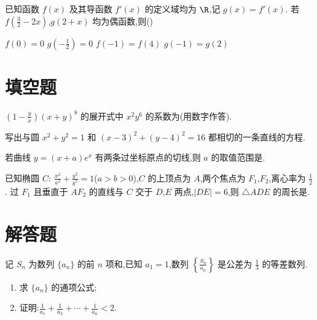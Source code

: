 \begin{problem}
已知函数 \(f(x)\) 及其导函数 \(f'(x)\) 的定义域均为 \(\R\),记 \(g(x)=f'(x)\). 若 \(f\left(\frac32-2x\right)\),\(g(2+x)\) 均为偶函数,则(\quad)

\choices
    {\(f(0)=0\)}
    {\(g\left(-\frac12\right)=0\)}
    {\(f(-1)=f(4)\)}
    {\(g(-1)=g(2)\)}
\end{problem}

\section{填空题}

\begin{problem}
\( \left(1-\frac{y}{x}\right)(x+y)^8 \) 的展开式中 \(x^2y^6\) 的系数为\fillinblank{}(用数字作答).
\end{problem}

\begin{problem}
写出与圆 \(x^2+y^2=1\) 和 \((x-3)^2+(y-4)^2=16\) 都相切的一条直线的方程\fillinblank{}.
\end{problem}

\begin{problem}
若曲线 \(y=(x+a)e^x\) 有两条过坐标原点的切线,则 \(a\) 的取值范围是\fillinblank{}.
\end{problem}

\begin{problem}
已知椭圆 \(C:\ \frac{x^2}{a^2}+\frac{y^2}{b^2}=1\)(\(a>b>0\)),\(C\) 的上顶点为 \(A\),两个焦点为 \(F_1\),\(F_2\),离心率为 \(\frac12\). 过 \(F_1\) 且垂直于 \(AF_2\) 的直线与 \(C\) 交于 \(D\),\(E\) 两点,\(|DE|=6\),则 \(\triangle ADE\) 的周长是\fillinblank{}.
\end{problem}

\section{解答题}

\begin{problem}
记 \(S_n\) 为数列 \(\{a_n\}\) 的前 \(n\) 项和,已知 \(a_1=1\),数列 \(\left\{\frac{S_n}{a_n}\right\}\) 是公差为 \(\frac13\) 的等差数列.

\begin{enumerate}
\item 求 \(\{a_n\}\) 的通项公式;

\item 证明:\(\frac1{a_1}+\frac1{a_2}+\cdots+\frac1{a_n}<2\).
\end{enumerate}
\end{problem}

